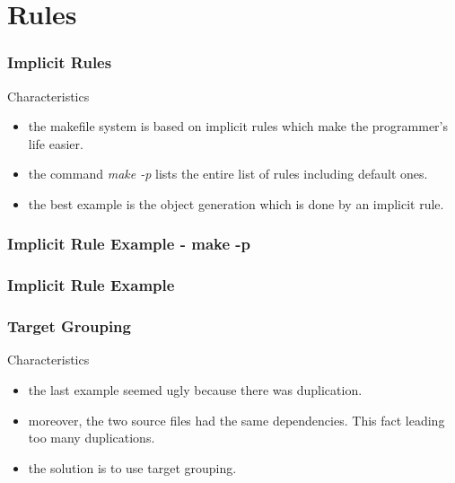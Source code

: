 \documentclass{beamer}
\begin{document}
\section{Rules}


\begin{frame}
  \frametitle{Implicit Rules}

  \begin{block}{Characteristics}
    \begin{itemize}
      \item<1->
        the makefile system is based on implicit rules which make the
        programmer's life easier.
      \item<1->
        the command \textit{make -p} lists the entire list of rules including
        default ones.
      \item<1->
        the best example is the object generation which is done by an implicit
        rule.
    \end{itemize}
  \end{block}

\end{frame}


\begin{frame}
  \frametitle{Implicit Rule Example - {\small make -p}}

  \begin{Example}
    
  \end{Example}

  \begin{Example}
    
  \end{Example}

\end{frame}


\begin{frame}
  \frametitle{Implicit Rule Example}

  \begin{Example}
    
  \end{Example}

\end{frame}


\begin{frame}
  \frametitle{Target Grouping}

  \begin{block}{Characteristics}
    \begin{itemize}
      \item
        the last example seemed ugly because there was duplication.
      \item
        moreover, the two source files had the same dependencies. This
        fact leading too many duplications.
      \item
        the solution is to use target grouping.
    \end{itemize}
  \end{block}

\end{frame}
\end{document}
